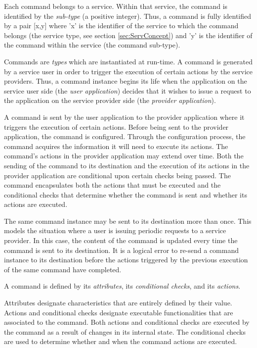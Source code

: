 Each command belongs to a service. 
Within that service, the command is identified by the \textit{sub-type} (a positive integer). 
Thus, a command is fully identified by a pair [x,y] where 'x' is the identifier of the service to which the command belongs (the service type, see section \ref{sec:ServConcept}) and 'y' is the identifier of the command within the service (the command sub-type).

Commands are \textit{types} which are instantiated at run-time. 
A command is generated by a service user in order to trigger the execution of certain actions by the service providers. Thus, a command instance begins its life when the application on the service user side (the \textit{user application}) decides that it wishes to issue a request to the application on the service provider side (the \textit{provider application}). 

A command is sent by the user application to the provider application where it triggers the execution of certain actions. Before being sent to the provider application, the command is configured. Through the configuration process, the command acquires the information it will need to execute its actions. The command's actions in the provider application may extend over time. Both the sending of the command to its destination and the execution of its actions in the provider application are conditional upon certain checks being passed. The command encapsulates both the actions that must be executed and the conditional checks that determine whether the command is sent and whether its actions are executed.

The same command instance may be sent to its destination more than once. This models the situation where a user is issuing periodic requests to a service provider. In this case, the content of the command is updated every time the command is sent to its destination. It is a logical error to re-send a command instance to its destination before the actions triggered by the previous execution of the same command have completed.

A command is defined by its \textit{attributes}, its \textit{conditional checks}, and its \textit{actions}. 

Attributes designate characteristics that are entirely defined by their value. 
Actions and conditional checks designate executable functionalities that are associated to the command. 
Both actions and conditional checks are executed by the command as a result of changes in its internal state. 
The conditional checks are used to determine whether and when the command actions are executed.

